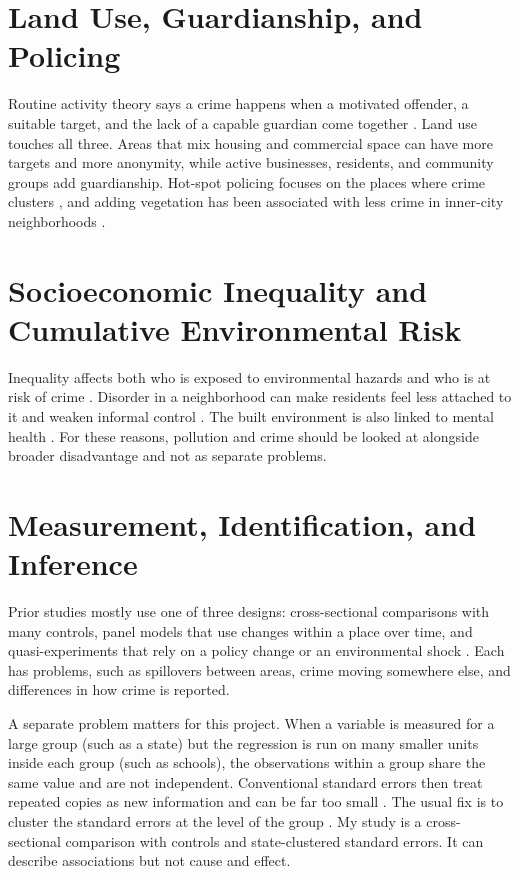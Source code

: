\documentclass[12pt,letterpaper]{report}
\begin{document}
\section{Land Use, Guardianship, and Policing}
Routine activity theory says a crime happens when a motivated offender, a suitable target,
and the lack of a capable guardian come together \cite{cohen1979}. Land use touches all
three. Areas that mix housing and commercial space can have more targets and more anonymity,
while active businesses, residents, and community groups add guardianship. Hot-spot policing
focuses on the places where crime clusters \cite{braga2010}, and adding vegetation has been
associated with less crime in inner-city neighborhoods \cite{kuo2001}.

\section{Socioeconomic Inequality and Cumulative Environmental Risk}
Inequality affects both who is exposed to environmental hazards and who is at risk of crime
\cite{sampson1995,messner1997,currie2011}. Disorder in a neighborhood can make residents feel
less attached to it and weaken informal control \cite{skogan1990}. The built environment is
also linked to mental health \cite{evans2003}. For these reasons, pollution and crime should
be looked at alongside broader disadvantage and not as separate problems.

\section{Measurement, Identification, and Inference}
Prior studies mostly use one of three designs: cross-sectional comparisons with many
controls, panel models that use changes within a place over time, and quasi-experiments that
rely on a policy change or an environmental shock \cite{glaeser1999,bondy2020,reyes2007}.
Each has problems, such as spillovers between areas, crime moving somewhere else, and
differences in how crime is reported.

A separate problem matters for this project. When a variable is measured for a large group
(such as a state) but the regression is run on many smaller units inside each group (such as
schools), the observations within a group share the same value and are not independent.
Conventional standard errors then treat repeated copies as new information and can be far
too small \cite{moulton1990}. The usual fix is to cluster the standard errors at the level of
the group \cite{cameron2015}. My study is a cross-sectional comparison with controls and
state-clustered standard errors. It can describe associations but not cause and effect.
\end{document}
